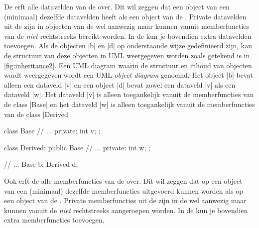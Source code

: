 \begin{cpplstShortInline}
De  erft alle datavelden van de  over.
Dit wil zeggen dat een object van een  (minimaal) dezelfde datavelden heeft als een object van de .
Private datavelden uit de  zijn in objecten van de  wel aanwezig maar kunnen vanuit memberfuncties van de  \emph{niet} rechtstreeks bereikt worden.
In de  kun je bovendien extra datavelden toevoegen.
Als de objecten |b| en |d| op onderstaande wijze gedefinieerd zijn, kan de structuur van deze objecten in UML weergegeven worden zoals getekend is in \cref{fig:inheritance2}. Een UML diagram waarin de structuur en inhoud van objecten wordt weergegeven wordt een UML \emph{object diagram} genoemd. 
Het object |b| bevat alleen een dataveld |v| en een object |d| bevat zowel een dataveld |v| als een dataveld |w|.
Het dataveld |v| is alleen toegankelijk vanuit de memberfuncties van de class |Base| en het dataveld |w| is alleen toegankelijk vanuit de memberfuncties van de class |Derived|.

\begin{cpplstfragment}
class Base {
//  ...
private:
    int v;
};
\end{cpplstfragment}

\vspace{-.5\baselineskip}
\begin{minipage}{\textwidth}
\begin{minipage}[c]{.5\textwidth}
\begin{cpplstfragment}
class Derived: public Base {
//  ...
private:
    int w;
};

//  ...
    Base b;
    Derived d;
\end{cpplstfragment}
\end{minipage}
\hfill
\begin{minipage}[c]{.5\textwidth}
\end{minipage}
\end{minipage}

Ook erft de  alle memberfuncties van de  over.
Dit wil zeggen dat op een object van een  (minimaal) dezelfde memberfuncties uitgevoerd kunnen worden als op een object van de .
Private memberfuncties uit de  zijn in de  wel aanwezig maar kunnen vanuit de  \emph{niet} rechtstreeks aangeroepen worden.
In de  kun je bovendien extra memberfuncties toevoegen.


\end{cpplstShortInline}

